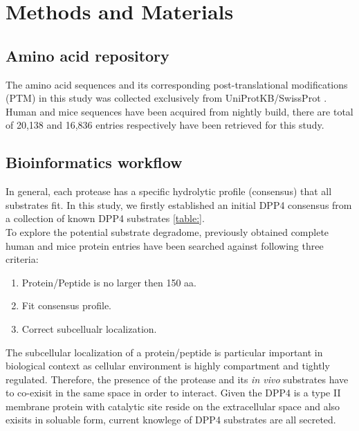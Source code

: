 \section{Methods and Materials}

\subsection{Amino acid repository}
The amino acid sequences and its corresponding post-translational modifications (PTM) in this study was collected exclusively from UniProtKB/SwissProt \cite{Magrane:2011fv}. Human and mice sequences have been acquired from nightly build, there are total of 20,138 and 16,836 entries respectively have been retrieved for this study. 
\\
\subsection{Bioinformatics workflow}
In general, each protease has a specific hydrolytic profile (consensus) that all substrates fit. In this study, we firstly established an initial DPP4 consensus from a collection of known DPP4 substrates \ref{table:}. 
\\
To explore the potential substrate degradome, previously obtained complete human and mice protein entries have been searched against following three criteria:
\begin{enumerate}
\item Protein/Peptide is no larger then 150 aa. 
\item Fit consensus profile.
\item Correct subcellualr localization.
\end{enumerate}

The subcellular localization of a protein/peptide is particular important in biological context as cellular environment is highly compartment and tightly regulated. Therefore, the presence of the protease and its \textit{in vivo} substrates have to co-exisit in the same space in order to interact. Given the DPP4 is a type II membrane protein with catalytic site reside on the extracellular space and also exisits in soluable form, current knowlege of DPP4 substrates are all secreted. 


